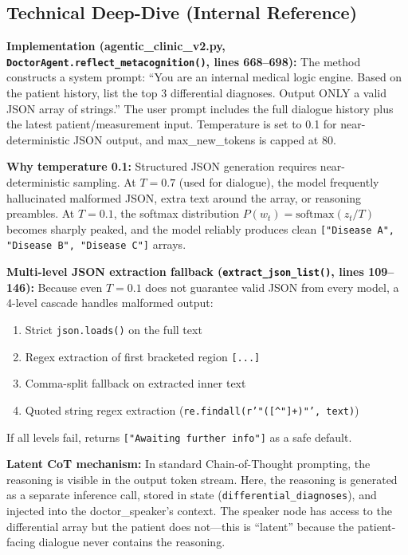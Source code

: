 \documentclass[12pt]{article}
\begin{document}
  \subsection*{Technical Deep-Dive (Internal Reference)}
  {\color{techgray}
  \textbf{Implementation (agentic\_clinic\_v2.py, \texttt{DoctorAgent.reflect\_metacognition()}, lines 668--698):} The method constructs a system prompt: ``You are an internal medical logic engine. Based on the patient history, list the top 3 differential diagnoses. Output ONLY a valid JSON array of strings.'' The user prompt includes the full dialogue history plus the latest patient/measurement input. Temperature is set to 0.1 for near-deterministic JSON output, and max\_new\_tokens is capped at 80.

  \textbf{Why temperature 0.1:} Structured JSON generation requires near-deterministic sampling. At $T=0.7$ (used for dialogue), the model frequently hallucinated malformed JSON, extra text around the array, or reasoning preambles. At $T=0.1$, the softmax distribution $P(w_t) = \text{softmax}(z_t / T)$ becomes sharply peaked, and the model reliably produces clean \texttt{["Disease A", "Disease B", "Disease C"]} arrays.

  \textbf{Multi-level JSON extraction fallback (\texttt{extract\_json\_list()}, lines 109--146):} Because even $T=0.1$ does not guarantee valid JSON from every model, a 4-level cascade handles malformed output:
  \begin{enumerate}
    \item Strict \texttt{json.loads()} on the full text
    \item Regex extraction of first bracketed region \texttt{[...]}
    \item Comma-split fallback on extracted inner text
    \item Quoted string regex extraction (\texttt{re.findall(r'"([^"]+)"', text)})
  \end{enumerate}
  If all levels fail, returns \texttt{["Awaiting further info"]} as a safe default.

  \textbf{Latent CoT mechanism:} In standard Chain-of-Thought prompting, the reasoning is visible in the output token stream. Here, the reasoning is generated as a separate inference call, stored in state (\texttt{differential\_diagnoses}), and injected into the doctor\_speaker's context. The speaker node has access to the differential array but the patient does not---this is ``latent'' because the patient-facing dialogue never contains the reasoning.

}
\end{document}
